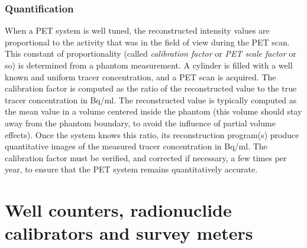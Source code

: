 \documentclass[11pt,oneside]{article}
\begin{document}
\subsubsection{Quantification} \label{sec:scalefactor}
When a PET system is well tuned, the reconstructed intensity values
are proportional to the activity that was in the field of view during
the PET scan. This constant of proportionality (called {\em
calibration factor} or {\em PET scale factor} or so) is determined
from a phantom measurement. A cylinder is filled with a well known and
uniform tracer concentration, and a PET scan is acquired. The
calibration factor is computed as the ratio of the reconstructed value
to the true tracer concentration in Bq/ml.  The reconstructed value is
typically computed as the mean value in a volume centered inside the
phantom (this volume should stay away from the phantom boundary, to
avoid the influence of partial volume effects). Once the system knows
this ratio, its reconstruction program(s) produce quantitative images
of the measured tracer concentration in Bq/ml. The calibration factor
must be verified, and corrected if necessary, a few times per year, to
ensure that the PET system remains quantitatively accurate.


\section[Well counters, radionuclide calibrators, survey meters]
        {Well counters, radionuclide calibrators and survey meters}
\end{document}
